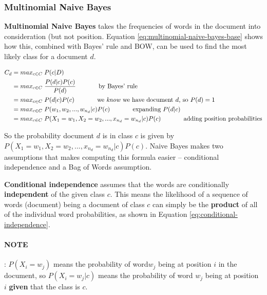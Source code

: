 \documentclass{article}
\begin{document}
\subsubsection{Multinomial Naive Bayes}

\textbf{Multinomial Naive Bayes} takes the frequencies of words in the document into consideration (but not position. Equation \ref{eq:multinomial-naive-bayes-base} shows how this, combined with Bayes' rule and BOW, can be used to find the most likely class for a document $d$.
 
\begin{equation}
\begin{aligned}[b]
	C_{d} &= max_{c \in C} \; P(c|D) \\
	&= max_{c \in C} \; \frac{P(d|c)P(c)}{P(d)} 
	\;\;\;\;\;\;\;\;\;\;\;\;\; \text{by Bayes' rule} \\
	&= max_{c \in C} \; P(d|c)P(c) 
	\;\;\;\;\;\;\;\;\;\;\;\;\; \text{we \textit{know} we have document }d\text{, so } P(d) = 1 \\
	&= max_{c \in C} \; P(w_1,w_2,...,w_{n_d}| c)P(c)
	\;\;\;\;\;\;\;\;\;\;\;\;\; \text{expanding }P(d|c) \\	
	&= max_{c \in C} \; P(X_1 = w_1, X_2 = w_2, ..., x_{n_d} = w_{n_d} | c)P(c)
	\;\;\;\;\;\;\;\;\;\;\;\;\; \text{adding position probabilities} \\
\end{aligned}
\label{eq:multinomial-naive-bayes-base}
\end{equation}

So the probability document $d$ is in class $c$ is given by $P(X_1 = w_1, X_2 = w_2, ..., x_{n_d} = w_{n_d} | c)P(c)$. Naive Bayes makes two assumptions that makes computing this formula easier -- conditional independence and a Bag of Words assumption.

\textbf{Conditional independence} assumes that the words are conditionally \textbf{independent} of the given class $c$.  This means the likelihood of a sequence of words (document) being a document of class $c$ can simply be the \textbf{product} of all of the individual word probabilities, as shown in Equation \ref{eq:conditional-independence}.

\paragraph{\textbf{NOTE}}: $P(X_i = w_j)$ means the probability of word$w_j$ being at position $i$ in the document, so $P(X_i = w_j|c)$ means the probability of word $w_j$ being at position $i$ \textbf{given} that the class is $c$.
\end{document}
